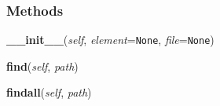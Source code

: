 
  \subsubsection{Methods}

    \label{xml:etree:ElementTree:ElementTree:__init__}

    \vspace{0.5ex}

\hspace{.8\funcindent}\begin{boxedminipage}{\funcwidth}

    \raggedright \textbf{\_\_init\_\_}(\textit{self}, \textit{element}={\tt None}, \textit{file}={\tt None})

\setlength{\parskip}{2ex}
\setlength{\parskip}{1ex}
    \end{boxedminipage}

    \label{xml:etree:ElementTree:ElementTree:find}

    \vspace{0.5ex}

\hspace{.8\funcindent}\begin{boxedminipage}{\funcwidth}

    \raggedright \textbf{find}(\textit{self}, \textit{path})

\setlength{\parskip}{2ex}
\setlength{\parskip}{1ex}
    \end{boxedminipage}

    \label{xml:etree:ElementTree:ElementTree:findall}

    \vspace{0.5ex}

\hspace{.8\funcindent}\begin{boxedminipage}{\funcwidth}

    \raggedright \textbf{findall}(\textit{self}, \textit{path})

\setlength{\parskip}{2ex}
\setlength{\parskip}{1ex}
    \end{boxedminipage}

